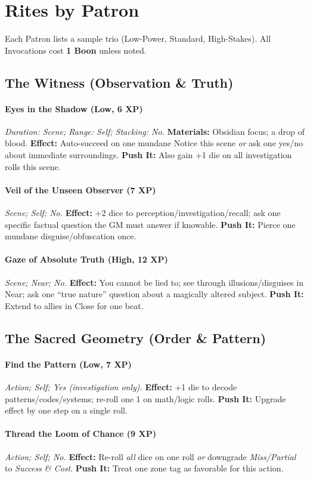 \documentclass[12pt,twoside]{book}
\begin{document}
\section{Rites by Patron}
Each Patron lists a sample trio (Low-Power, Standard, High-Stakes). All Invocations cost \textbf{1 Boon} unless noted.

\subsection{The Witness (Observation \& Truth)}
\paragraph{Eyes in the Shadow (Low, 6 XP)} \emph{Duration: Scene; Range: Self; Stacking: No.}
\textbf{Materials:} Obsidian focus; a drop of blood.
\textbf{Effect:} Auto-succeed on one mundane Notice this scene \emph{or} ask one yes/no about immediate surroundings.
\textbf{Push It:} Also gain +1 die on all investigation rolls this scene.
\paragraph{Veil of the Unseen Observer (7 XP)} \emph{Scene; Self; No.}
\textbf{Effect:} +2 dice to perception/investigation/recall; ask one specific factual question the GM must answer if knowable.
\textbf{Push It:} Pierce one mundane disguise/obfuscation once.
\paragraph{Gaze of Absolute Truth (High, 12 XP)} \emph{Scene; Near; No.}
\textbf{Effect:} You cannot be lied to; see through illusions/disguises in Near; ask one ``true nature'' question about a magically altered subject.
\textbf{Push It:} Extend to allies in Close for one beat.

\subsection{The Sacred Geometry (Order \& Pattern)}
\paragraph{Find the Pattern (Low, 7 XP)} \emph{Action; Self; Yes (investigation only).}
\textbf{Effect:} +1 die to decode patterns/codes/systems; re-roll one 1 on math/logic rolls.
\textbf{Push It:} Upgrade effect by one step on a single roll.
\paragraph{Thread the Loom of Chance (9 XP)} \emph{Action; Self; No.}
\textbf{Effect:} Re-roll \emph{all} dice on one roll \emph{or} downgrade \emph{Miss/Partial} to \emph{Success \& Cost}.
\textbf{Push It:} Treat one zone tag as favorable for this action.
\end{document}
